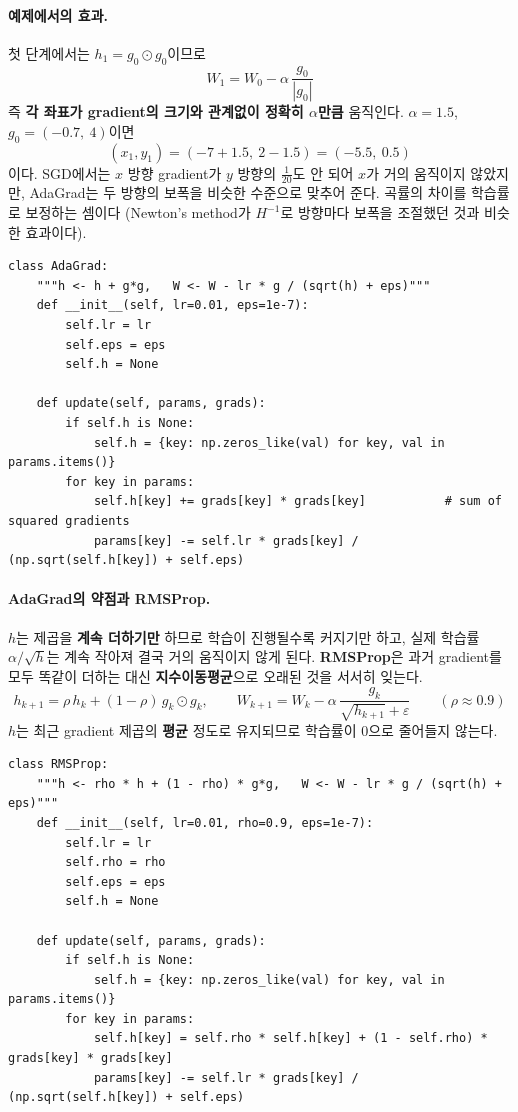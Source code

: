 \documentclass[11pt,a4paper]{article}
\begin{document}
\paragraph{예제에서의 효과.}
첫 단계에서는 $h_1=g_0\odot g_0$이므로
\[
W_1=W_0-\alpha\,\frac{g_0}{|g_0|}
\]
즉 \textbf{각 좌표가 gradient의 크기와 관계없이 정확히 $\alpha$만큼} 움직인다.
$\alpha=1.5$, $g_0=(-0.7,\ 4)$이면
\[
(x_1,y_1)=(-7+1.5,\ 2-1.5)=(-5.5,\ 0.5)
\]
이다. SGD에서는 $x$ 방향 gradient가 $y$ 방향의 $\frac{1}{20}$도 안 되어 $x$가 거의 움직이지 않았지만,
AdaGrad는 두 방향의 보폭을 비슷한 수준으로 맞추어 준다.
곡률의 차이를 학습률로 보정하는 셈이다
(Newton's method가 $H^{-1}$로 방향마다 보폭을 조절했던 것과 비슷한 효과이다).

\begin{lstlisting}
class AdaGrad:
    """h <- h + g*g,   W <- W - lr * g / (sqrt(h) + eps)"""
    def __init__(self, lr=0.01, eps=1e-7):
        self.lr = lr
        self.eps = eps
        self.h = None

    def update(self, params, grads):
        if self.h is None:
            self.h = {key: np.zeros_like(val) for key, val in params.items()}
        for key in params:
            self.h[key] += grads[key] * grads[key]           # sum of squared gradients
            params[key] -= self.lr * grads[key] / (np.sqrt(self.h[key]) + self.eps)
\end{lstlisting}

\paragraph{AdaGrad의 약점과 RMSProp.}
$h$는 제곱을 \textbf{계속 더하기만} 하므로 학습이 진행될수록 커지기만 하고,
실제 학습률 $\alpha/\sqrt{h}$는 계속 작아져 결국 거의 움직이지 않게 된다.
\textbf{RMSProp}은 과거 gradient를 모두 똑같이 더하는 대신 \textbf{지수이동평균}으로 오래된 것을 서서히 잊는다.
\[
\boxed{
h_{k+1}=\rho\,h_k+(1-\rho)\,g_k\odot g_k,
\qquad
W_{k+1}=W_k-\alpha\,\frac{g_k}{\sqrt{h_{k+1}}+\varepsilon}
}
\qquad(\rho\approx0.9)
\]
$h$는 최근 gradient 제곱의 \textbf{평균} 정도로 유지되므로 학습률이 $0$으로 줄어들지 않는다.

\begin{lstlisting}
class RMSProp:
    """h <- rho * h + (1 - rho) * g*g,   W <- W - lr * g / (sqrt(h) + eps)"""
    def __init__(self, lr=0.01, rho=0.9, eps=1e-7):
        self.lr = lr
        self.rho = rho
        self.eps = eps
        self.h = None

    def update(self, params, grads):
        if self.h is None:
            self.h = {key: np.zeros_like(val) for key, val in params.items()}
        for key in params:
            self.h[key] = self.rho * self.h[key] + (1 - self.rho) * grads[key] * grads[key]
            params[key] -= self.lr * grads[key] / (np.sqrt(self.h[key]) + self.eps)
\end{lstlisting}
\end{document}
